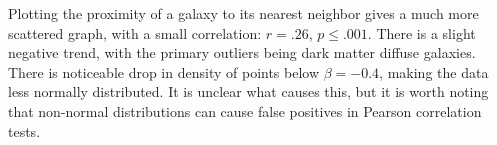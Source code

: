 Plotting the proximity of a galaxy to its nearest neighbor gives a much more scattered graph, with a small correlation: $r = .26$, $p \leq .001$. There is a slight negative trend, with the primary outliers being dark matter diffuse galaxies. There is noticeable drop in density of points below $\beta = -0.4$, making the data less normally distributed. It is unclear what causes this, but it is worth noting that non-normal distributions can cause false positives in Pearson correlation tests.